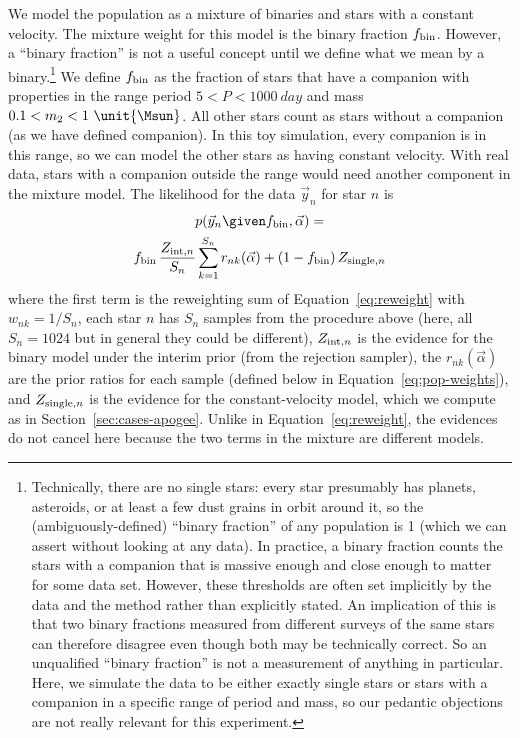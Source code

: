 \documentclass[twocolumn]{AASTeX7/aastex701}
\begin{document}
We model the population as a mixture of binaries and stars with a constant velocity.
The mixture weight for this model is the binary fraction $f_{\rm bin}$.
However, a ``binary fraction'' is not a useful concept until we define what we mean by
a binary.\footnote{Technically, there are no single stars: every star presumably has
planets, asteroids, or at least a few dust grains in orbit around it, so the
(ambiguously-defined) ``binary fraction'' of any population is 1 (which we can assert
without looking at any data).
In practice, a binary fraction counts the stars with a companion that is massive enough
and close enough to matter for some data set.
However, these thresholds are often set implicitly by the data and the method rather
than explicitly stated.
An implication of this is that two binary fractions measured from different surveys of
the same stars can therefore disagree even though both may be technically correct.
So an unqualified ``binary fraction'' is not a measurement of anything in particular.
Here, we simulate the data to be either exactly single stars or stars with a
companion in a specific range of period and mass, so our pedantic objections are not
really relevant for this experiment.}
We define $f_{\rm bin}$ as the fraction of stars that have a companion with properties
in the range period $5 < P < 1000~\unit{day}$ and mass $0.1 < m_2 < 1~\unit{\Msun}$.
All other stars count as stars without a companion (as we have defined companion).
In this toy simulation, every companion is in this range, so we can model the other
stars as having constant velocity.
With real data, stars with a companion outside the range would need another component in
the mixture model.
The likelihood for the data $\vec{y}_n$ for star $n$ is
\begin{multline}
  p(\vec{y}_n \given f_{\rm bin}, \vec{\alpha}) = \\
    f_{\rm bin}\,\frac{Z_{{\rm int},n}}{S_n} \sum_{k=1}^{S_n} r_{nk}(\vec{\alpha})
    + (1 - f_{\rm bin})\,Z_{{\rm single},n}
  \label{eq:pop-mixture}
\end{multline}
where the first term is the reweighting sum of Equation~\ref{eq:reweight} with
$w_{nk} = 1/S_n$, each star
$n$ has $S_n$ samples from the procedure above (here, all $S_n = 1024$ but in general
they could be different), $Z_{{\rm int},n}$ is the evidence for the binary model under
the interim prior (from the rejection sampler), the $r_{nk}(\vec{\alpha})$ are the
prior ratios for each sample (defined below in Equation~\ref{eq:pop-weights}), and
$Z_{{\rm single},n}$ is the evidence for the constant-velocity model, which we compute
as in Section~\ref{sec:cases-apogee}.
Unlike in Equation~\ref{eq:reweight}, the evidences do not cancel here because the two
terms in the mixture are different models.
\end{document}
